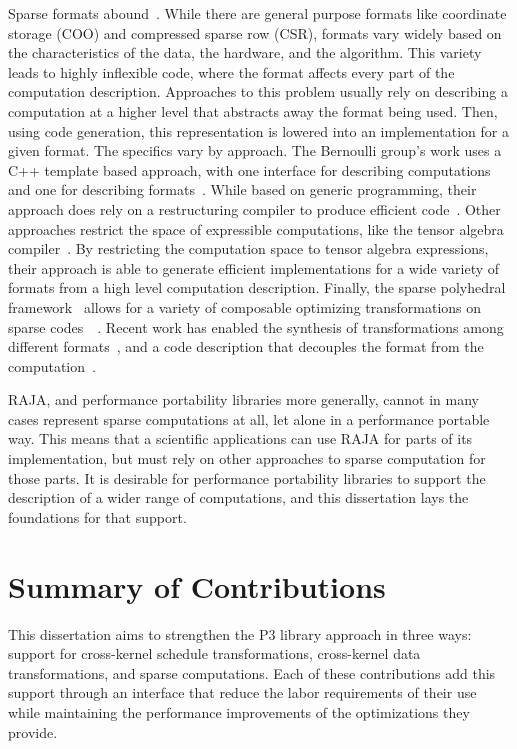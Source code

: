 Sparse formats abound~\cite{langr2015evaluation}. 
While there are general purpose formats like coordinate storage (COO) and compressed sparse row (CSR), formats vary widely based on the characteristics of the data, the hardware, and the algorithm.
This variety leads to highly inflexible code, where the format affects every part of the computation description.
Approaches to this problem usually rely on describing a computation at a higher level that abstracts away the format being used.
Then, using code generation, this representation is lowered into an implementation for a given format.
The specifics vary by approach.
The Bernoulli group's work uses a C++ template based approach, with one interface for describing computations~\cite{kotlyar1997relational} and one for describing formats~\cite{kotlyar1997compiling}.
While based on generic programming, their approach does rely on a restructuring compiler to produce efficient code~\cite{mateev2000bernoulli,ahmed2000framework}.
Other approaches restrict the space of expressible computations, like the tensor algebra compiler~\cite{kjolstad2017tensor}.
By restricting the computation space to tensor algebra expressions, their approach is able to generate efficient implementations for a wide variety of formats from a high level computation description.
Finally, the sparse polyhedral framework~\cite{strout2016approach} allows for a variety of composable optimizing transformations on sparse codes~~\cite{ahmad2017optimizing}.
Recent work has enabled the synthesis of transformations among different formats~\cite{popoola2023code}, and a code description that decouples the format from the computation~\cite{zhao2022polyhedral}.

RAJA, and performance portability libraries more generally, cannot in many cases represent sparse computations at all, let alone in a performance portable way.
This means that a scientific applications can use RAJA for parts of its implementation, but must rely on other approaches to sparse computation for those parts.
It is desirable for performance portability libraries to support the description of a wider range of computations, and this dissertation lays the foundations for that support.

\section{Summary of Contributions}

This dissertation aims to strengthen the P3 library approach in three ways: support for cross-kernel schedule transformations, cross-kernel data transformations, and sparse computations.
Each of these contributions add this support through an interface that reduce the labor requirements of their use while maintaining the performance improvements of the optimizations they provide.

